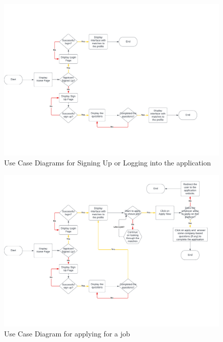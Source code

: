 \begin{figure}
    \noindent
    \centering
    \includegraphics[width = 140mm]{Figures/signup.pdf}
    \decoRule
    \caption[Use Case Diagrams for Signing Up or Logging into the application]{Use Case Diagrams for Signing Up or Logging into the application}
    \label{fig: Use Case Diagrams for Signing Up or Logging into the application}
\end{figure}

\begin{figure}
    \noindent
    \centering
    \includegraphics[width = 140mm]{Figures/applying.pdf}
    \decoRule
    \caption[Use Case Diagram for applying for a job]{Use Case Diagram for applying for a job}
    \label{fig: Use Case Diagram for applying for a job}
\end{figure}

